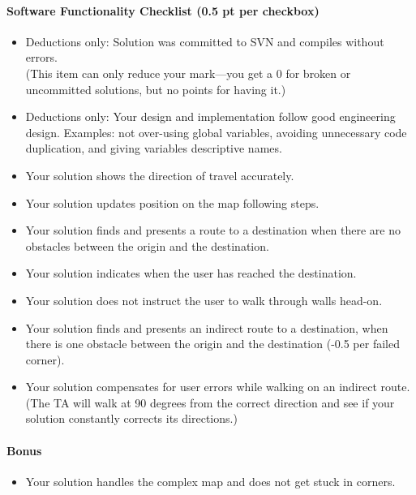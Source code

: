 \documentclass[10pt]{article}
\begin{document}
\paragraph{Software Functionality Checklist (0.5 pt per checkbox)}
\begin{itemize}
\renewcommand{\labelitemi}{$\Box$}
\item Deductions only: Solution was committed to SVN and compiles without errors. \\
(This item can only reduce your mark---you get a 0 for broken or uncommitted solutions, but no points for having it.)
\renewcommand{\labelitemi}{$\Box\Box$}
\item Deductions only: Your design and implementation follow good engineering design. Examples: not over-using global variables, avoiding unnecessary code duplication, and giving variables descriptive names.
\item Your solution shows the direction of travel accurately.
\renewcommand{\labelitemi}{$\Box\Box\Box\Box\Box$}
\item Your solution updates position on the map following steps.
\item Your solution finds and presents a route to a destination when there are no obstacles between the origin and the destination.
\renewcommand{\labelitemi}{$\Box$}
\item Your solution indicates when the user has reached the destination.
\renewcommand{\labelitemi}{$\Box\Box$}
\item Your solution does not instruct the user to walk through walls head-on.
\item Your solution finds and presents an indirect route to a destination, when there is one obstacle between the origin and the destination (-0.5 per failed corner).
\renewcommand{\labelitemi}{$\Box\Box\Box$}
\item Your solution compensates for user errors while walking on an indirect route. (The TA will walk at 90 degrees from the correct direction and see if your solution constantly corrects its directions.)

\end{itemize}
\paragraph{Bonus}
\begin{itemize}
\renewcommand{\labelitemi}{$\Box\Box$}

\item Your solution handles the complex map and does not get stuck in corners.
\end{itemize}
\end{document}
